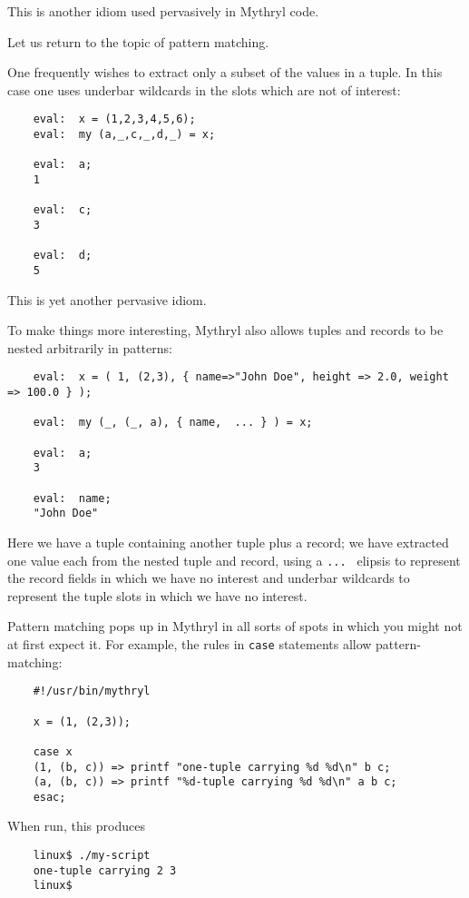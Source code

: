 This is another idiom used pervasively in Mythryl code.

Let us return to the topic of pattern matching.

One frequently wishes to extract only a subset of the values in a 
tuple.  In this case one uses underbar wildcards in the slots which 
are not of interest:


\begin{verbatim}
    eval:  x = (1,2,3,4,5,6);
    eval:  my (a,_,c,_,d,_) = x;

    eval:  a;
    1

    eval:  c;
    3

    eval:  d;
    5
\end{verbatim}

This is yet another pervasive idiom.

To make things more interesting, Mythryl also allows tuples and records to 
be nested arbitrarily in patterns:

\begin{verbatim}
    eval:  x = ( 1, (2,3), { name=>"John Doe", height => 2.0, weight => 100.0 } );

    eval:  my (_, (_, a), { name,  ... } ) = x;

    eval:  a;
    3

    eval:  name;
    "John Doe"
\end{verbatim}

Here we have a tuple containing another tuple plus a record;  we 
have extracted one value each from the nested tuple and record, 
using a {\tt ... } elipsis to represent the record fields in which 
we have no interest and underbar wildcards to represent the tuple 
slots in which we have no interest.

Pattern matching pops up in Mythryl in all sorts of spots in which 
you might not at first expect it.  For example, the rules in 
{\tt case} statements allow pattern-matching:

\begin{verbatim}
    #!/usr/bin/mythryl

    x = (1, (2,3));

    case x
    (1, (b, c)) => printf "one-tuple carrying %d %d\n" b c;
    (a, (b, c)) => printf "%d-tuple carrying %d %d\n" a b c;
    esac;
\end{verbatim}

When run, this produces

\begin{verbatim}
    linux$ ./my-script
    one-tuple carrying 2 3
    linux$ 
\end{verbatim}

